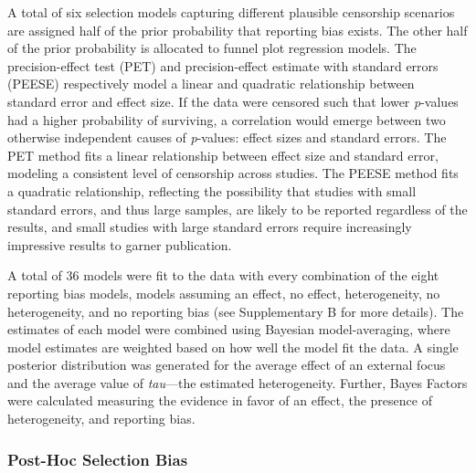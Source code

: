 \documentclass[man,floatsintext,letterpaper,12pt]{apa7}
\begin{document}
A total of six selection models capturing different plausible censorship scenarios are assigned half of the prior probability that reporting bias exists. The other half of the prior probability is allocated to funnel plot regression models. The precision-effect test (PET) and precision-effect estimate with standard errors (PEESE) respectively model a linear and quadratic relationship between standard error and effect size. If the data were censored such that lower \emph{p}-values had a higher probability of surviving, a correlation would emerge between two otherwise independent causes of \emph{p}-values: effect sizes and standard errors. The PET method fits a linear relationship between effect size and standard error, modeling a consistent level of censorship across studies. The PEESE method fits a quadratic relationship, reflecting the possibility that studies with small standard errors, and thus large samples, are likely to be reported regardless of the results, and small studies with large standard errors require increasingly impressive results to garner publication.\footnotemark{}

A total of 36 models were fit to the data with every combination of the eight reporting bias models, models assuming an effect, no effect, heterogeneity, no heterogeneity, and no reporting bias (see Supplementary B for more details). The estimates of each model were combined using Bayesian model-averaging, where model estimates are weighted based on how well the model fit the data. A single posterior distribution was generated for the average effect of an external focus and the average value of \emph{tau}---the estimated heterogeneity. Further, Bayes Factors were calculated measuring the evidence in favor of an effect, the presence of heterogeneity, and reporting bias.

\subsubsection{Post-Hoc Selection Bias}
\end{document}
